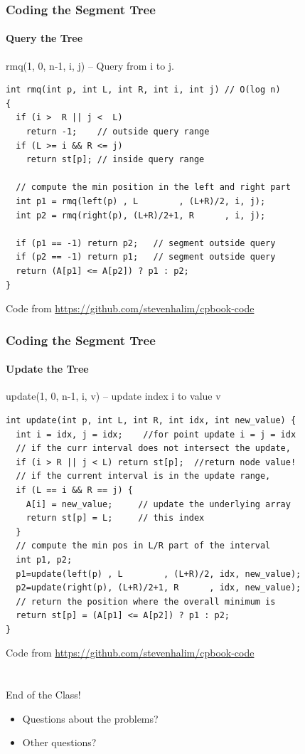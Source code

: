 \documentclass{beamer}
\begin{document}
\begin{frame}[fragile]
  \frametitle{Coding the Segment Tree}
  \framesubtitle{Query the Tree}
{\smaller
\begin{block}{rmq(1, 0, n-1, i, j) -- Query from i to j.}
\begin{verbatim}
int rmq(int p, int L, int R, int i, int j) // O(log n)
{
  if (i >  R || j <  L)
    return -1;    // outside query range
  if (L >= i && R <= j)
    return st[p]; // inside query range

  // compute the min position in the left and right part
  int p1 = rmq(left(p) , L        , (L+R)/2, i, j);
  int p2 = rmq(right(p), (L+R)/2+1, R      , i, j);

  if (p1 == -1) return p2;   // segment outside query
  if (p2 == -1) return p1;   // segment outside query
  return (A[p1] <= A[p2]) ? p1 : p2;
}
\end{verbatim}
\end{block}}
\hfill\footnotesize{Code from \url{https://github.com/stevenhalim/cpbook-code}}
\end{frame}

\begin{frame}[fragile]
  \frametitle{Coding the Segment Tree}
  \framesubtitle{Update the Tree}

{\smaller
\begin{block}{update(1, 0, n-1, i, v) -- update index i to value v}
\begin{verbatim}
int update(int p, int L, int R, int idx, int new_value) {
  int i = idx, j = idx;    //for point update i = j = idx
  // if the curr interval does not intersect the update,
  if (i > R || j < L) return st[p];  //return node value!
  // if the current interval is in the update range,
  if (L == i && R == j) {
    A[i] = new_value;     // update the underlying array
    return st[p] = L;     // this index
  }
  // compute the min pos in L/R part of the interval
  int p1, p2;
  p1=update(left(p) , L        , (L+R)/2, idx, new_value);
  p2=update(right(p), (L+R)/2+1, R      , idx, new_value);
  // return the position where the overall minimum is
  return st[p] = (A[p1] <= A[p2]) ? p1 : p2;
}
\end{verbatim}
\end{block}}
\hfill\footnotesize{Code from \url{https://github.com/stevenhalim/cpbook-code}}

\end{frame}



\section{}
\begin{frame}
  End of the Class!

  \vfill

  \begin{itemize}
    \item Questions about the problems?
    \bigskip

    \item Other questions?
  \end{itemize}
\end{frame}
\end{document}

